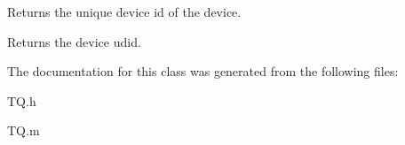 Returns the \textquotesingle{}unique device id\textquotesingle{} of the device.

\begin{DoxyReturn}{Returns}
the device udid. 
\end{DoxyReturn}


The documentation for this class was generated from the following files\+:\begin{DoxyCompactItemize}
\item 
T\+Q.\+h\item 
T\+Q.\+m\end{DoxyCompactItemize}
